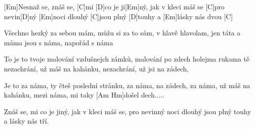 
[Em]Nesnaž se, znáš se, 
[C] mi [D]co je ji[Em]ný, jak v kleci máš se [C]pro nevin[D]ný
[Em]noci dlouhý [C]jsou plný [D]touhy a [Em]lásky nás dvou [C]

Všechno hezký za sebou mám, 
můžu si za to  sám, v hlavě hlavolam,
jen táta a máma jsou s náma, napořád s náma  

To je to tvoje malování vzdušnejch zámků, 
malování po zdech holejma rukama
tě nezachrání, už máš na kahánku, 
nezachrání, už jsi na zádech,

Je to za náma, ty čteš poslední stránku, 
za náma, na zádech, za náma,
už máš na kahánku, mezi náma, 
mi taky [Am Hm]došel dech.....

Znáš se,  mi co je jiný, 
jak v kleci máš se, pro nevinný
noci dlouhý jsou plný touhy a lásky nás tří.